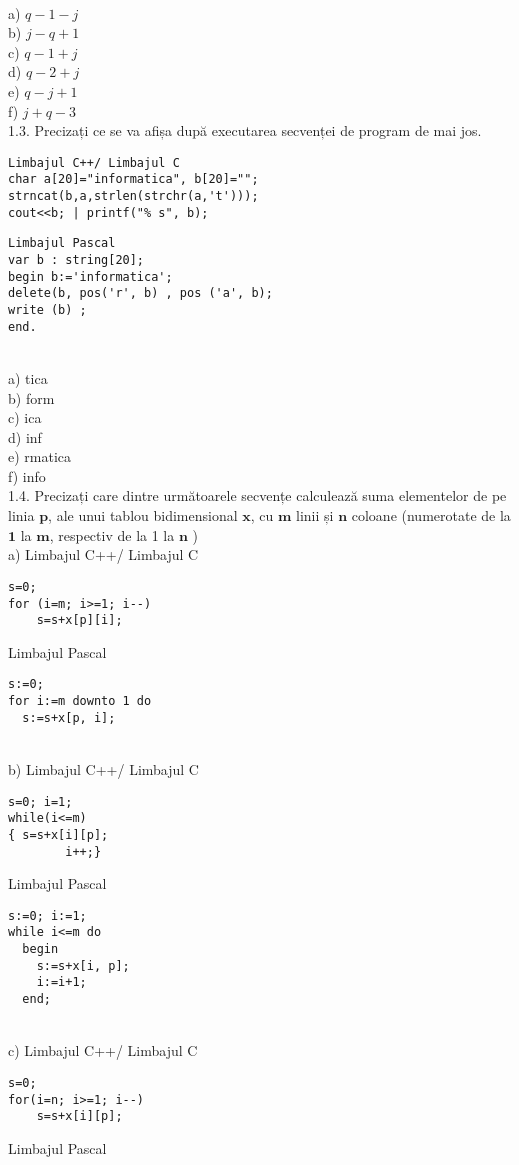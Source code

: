 \\
a) $q-1-j$
\\
b) $j-q+1$
\\
c) $q-1+j$
\\
d) $q-2+j$
\\
e) $q-j+1$
\\
f) $j+q-3$
\\
1.3. Precizați ce se va afișa după executarea secvenței de program de mai jos.
\begin{verbatim}
Limbajul C++/ Limbajul C
char a[20]="informatica", b[20]="";
strncat(b,a,strlen(strchr(a,'t')));
cout<<b; | printf("% s", b);
\end{verbatim}
\begin{verbatim}
Limbajul Pascal
var b : string[20];
begin b:='informatica';
delete(b, pos('r', b) , pos ('a', b); 
write (b) ;
end.
\end{verbatim}
\\
a) tica
\\
b) form
\\
c) ica
\\
d) inf
\\
e) rmatica
\\
f) info
\\
1.4. Precizați care dintre următoarele secvențe calculează suma elementelor de pe linia $\mathbf{p}$, ale unui tablou bidimensional $\mathbf{x}$, cu $\mathbf{m}$ linii și $\mathbf{n}$ coloane (numerotate de la $\mathbf{1}$ la $\mathbf{m}$, respectiv de la 1 la $\mathbf{n}$ )
\\
a) Limbajul C++/ Limbajul C
\begin{verbatim}
s=0;
for (i=m; i>=1; i--)
    s=s+x[p][i];
\end{verbatim}
Limbajul Pascal
\begin{verbatim}
s:=0;
for i:=m downto 1 do
  s:=s+x[p, i];
\end{verbatim}
\\
b) Limbajul C++/ Limbajul C
\begin{verbatim}
s=0; i=1;
while(i<=m)
{ s=s+x[i][p];
        i++;}
\end{verbatim}
Limbajul Pascal
\begin{verbatim}
s:=0; i:=1;
while i<=m do
  begin
    s:=s+x[i, p];
    i:=i+1;
  end;
\end{verbatim}
\\
c) Limbajul C++/ Limbajul C
\begin{verbatim}
s=0;
for(i=n; i>=1; i--)
    s=s+x[i][p];
\end{verbatim}
Limbajul Pascal
